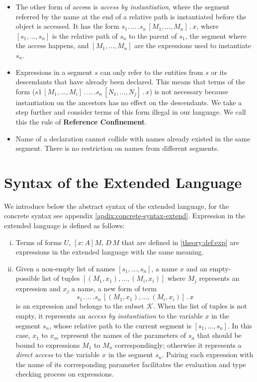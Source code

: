 \begin{definition}[Segment]
\begin{itemize}
  \item The other form of access is \emph{access by instantiation}, where the segment referred by the name at the end of a relative path is instantiated before the object is accessed. It has the form $s_1.\,\dots\,.s_n\,[M_1,\dots,M_n]\,.\,x$, where $[s_1,\dots,s_n]$ is the relative path of $s_n$ to the parent of $s_1$, the segment where the access happens, and $[M_1,\dots,M_n]$ are the expressions used to instantiate $s_n$.
  \item Expressions in a segment $s$ can only refer to the entities from $s$ or its descendants that have already been declared. This means that terms of the form ($s1\,[M_1,\dots,M_{i}]\,.\,\dots\,.s_n\,[N_1,\dots,N_j]\,.\,x$) is not necessary because instantiation on the ancestors has no effect on the descendants. We take a step further and consider terms of this form illegal in our language. We call this the rule of \textbf{Reference Confinement}.
  \item Name of a declaration cannot collide with names already existed in the same segment. There is no restriction on names from different segments.  
  \end{itemize}
\end{definition}

\section{Syntax of the Extended Language}
We introduce below the abstract syntax of the extended language, for the concrete syntax see appendix \ref{apdix:concrete-syntax-extend}. Expression in the extended language is defined as follows:
\begin{definition}[Expression]
  \leavevmode \vspace{-\baselineskip}
  \begin{enumerate}[(i)]
  \item Terms of forms $U$, $[x:A]M$, $D\,M$ that are defined in \ref{theory:def:exp} are expressions in the extended language with the same meaning.
  \item Given a non-empty list of names $[s_1,\dots,s_n]$, a name $x$ and an empty-possible list of tuples $[(M_1, x_1),\dots,(M_i,x_i)]$ where $M_j$ represents an expression and $x_j$ a name, a new form of term
    \[ s_1.\,\dots\,.s_n\,[(M_1,x_1),\dots,(M_i,x_i)]\,.\,x \]
    is an expression and belongs to the subset $\mathcal{K}$. When the list of tuples is not empty, it represents an \emph{access by instantiation} to the variable $x$ in the segment $s_n$, whose relative path to the current segment is $[s_1,\dots,s_n]$. In this case, $x_1$ to $x_m$ represent the names of the parameters of $s_n$ that should be bound to expressions $M_1$ to $M_n$ correspondingly; otherwise it represents a \emph{direct access} to the variable $x$ in the segment $s_n$. Pairing each expression with the name of its corresponding parameter facilitates the evaluation and type checking process on expressions.
  \end{enumerate}
\end{definition}


